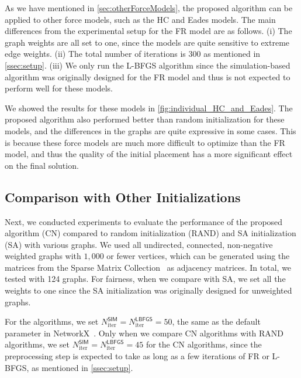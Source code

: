 \documentclass{jgaa-art}
\begin{document}
As we have mentioned in \cref{sec:otherForceModels}, the proposed algorithm can be applied to other force models, such as the HC and Eades models.
The main differences from the experimental setup for the FR model are as follows.
(i) The graph weights are all set to one, since the models are quite sensitive to extreme edge weights.
(ii) The total number of iterations is 300 as mentioned in \cref{ssec:setup}.
(iii) We only run the L-BFGS algorithm since the simulation-based algorithm was originally designed for the FR model and thus is not expected to perform well for these models.



We showed the results for these models in \cref{fig:individual_HC_and_Eades}.
The proposed algorithm also performed better than random initialization for these models, and the differences in the graphs are quite expressive in some cases.
This is because these force models are much more difficult to optimize than the FR model, and thus the quality of the initial placement has a more significant effect on the final solution.


\subsection{Comparison with Other Initializations} %
\label{ssec:exprAll}

Next, we conducted experiments to evaluate the performance of the proposed algorithm (\textsf{CN}) compared to random initialization (\textsf{RAND}) and SA initialization (\textsf{SA}) with various graphs.
We used all undirected, connected, non-negative weighted graphs with $1{,}000$ or fewer vertices, which can be generated using the matrices from the Sparse Matrix Collection~\citep{davisUniversityFloridaSparse2011} as adjacency matrices.
In total, we tested with 124 graphs.
For fairness, when we compare with \textsf{SA}, we set all the weights to one since the SA initialization was originally designed for unweighted graphs.

For the algorithms, we set $N_{\mathrm{iter}}^{\mathsf{SIM}} = N_{\mathrm{iter}}^{\mathsf{LBFGS}}= 50$, the same as the default parameter in NetworkX~\citep{hagbergExploringNetworkStructure2008}.
Only when we compare \textsf{CN} algorithms with \textsf{RAND} algorithms, we set $N_{\mathrm{iter}}^{\mathsf{SIM}}= N_{\mathrm{iter}}^{\mathsf{LBFGS}}= 45$ for the \textsf{CN} algorithms, since the preprocessing step is expected to take as long as a few iterations of FR or L-BFGS, as mentioned in \cref{ssec:setup}.
\end{document}
